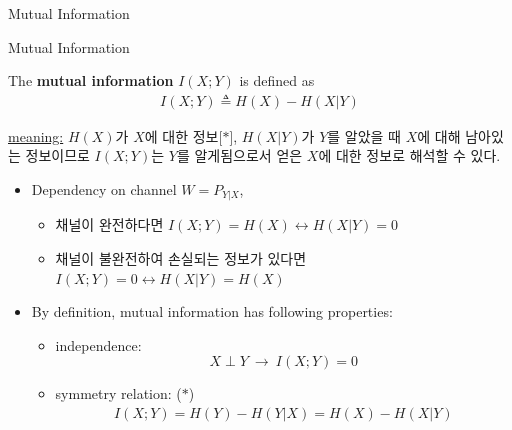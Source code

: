 \documentclass[9pt]{beamer}
\begin{document}
    \begin{section}{Mutual Information}
        \begin{frame}{Mutual Information}

            \begin{definition}
                The \textbf{mutual information} $I(X;Y)$ is defined as
                \begin{align*}
                    I(X;Y) \triangleq H(X) - H(X|Y)
                \end{align*}
            \end{definition}
            \checkmark \underline {meaning:} $H(X)$가 $X$에 대한 정보[$\ast$], $H(X|Y)$가 $Y$를 알았을 때 $X$에 대해 남아있는 정보이므로 $I(X;Y)$는 \alert{$Y$를 알게됨으로서 얻은 $X$에 대한 정보}로 해석할 수 있다.
            \vspace{0.3cm}
            \begin{itemize}
                \item Dependency on channel $W=P_{Y|X}$,
                \begin{itemize}
                    \item 채널이 완전하다면 $I(X; Y) = H(X) \leftrightarrow H(X|Y) =0$
                    \item 채널이 불완전하여 손실되는 정보가 있다면 $I(X; Y) = 0 \leftrightarrow H(X|Y) =H(X)$
                \end{itemize}
                \item By definition, mutual information has following properties:
                \begin{itemize}
                    \item independence:
                    $$ X \perp Y \  \rightarrow \ I(X;Y) = 0 $$
                    \item symmetry relation: ($\ast$)
                    \begin{align*} I(X ; Y) =H(Y)-H(Y | X) = H(X)-H(X | Y) \end{align*}
                    \vspace{0.5cm}
                \end{itemize}
            \end{itemize}
        \end{frame}


\end{section}
\end{document}
